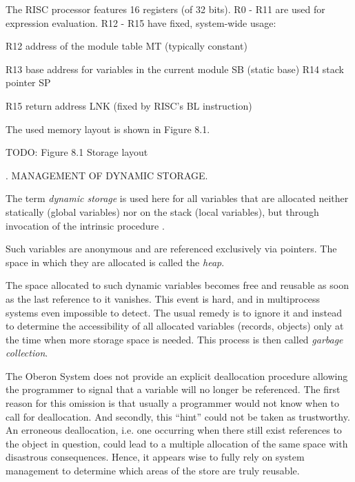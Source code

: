 The RISC processor features 16 registers (of 32 bits). R0 - R11 are used for expression evaluation. R12 - R15 have fixed, system-wide usage:

R12 address of the module table MT (typically constant)

R13 base address for variables in the current module SB (static base) R14 stack pointer SP

R15 return address LNK (fixed by RISC's BL instruction)

The used memory layout is shown in Figure 8.1.

TODO: Figure 8.1 Storage layout

. MANAGEMENT OF DYNAMIC STORAGE.

The term \emph{dynamic storage} is used here for all variables that are allocated neither statically (global variables) nor on the stack (local variables), but through invocation of the intrinsic procedure .

Such variables are anonymous and are referenced exclusively via pointers. The space in which they are allocated is called the \emph{heap}.

The space allocated to such dynamic variables becomes free and reusable as soon as the last reference to it vanishes. This event is hard, and in multiprocess systems even impossible to detect. The usual remedy is to ignore it and instead to determine the accessibility of all allocated variables (records, objects) only at the time when more storage space is needed. This process is then called \emph{garbage collection}.

The Oberon System does not provide an explicit deallocation procedure allowing the programmer to signal that a variable will no longer be referenced. The first reason for this omission is that usually a programmer would not know when to call for deallocation. And secondly, this ``hint'' could not be taken as trustworthy. An erroneous deallocation, i.e. one occurring when there still exist references to the object in question, could lead to a multiple allocation of the same space with disastrous consequences. Hence, it appears wise to fully rely on system management to determine which areas of the store are truly reusable.

